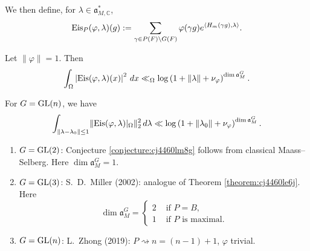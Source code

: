 \documentclass[reqno]{amsart} 
\begin{document}
We then define, for $\lambda \in \mathfrak{a}_{M, \mathbb{C} }^\ast$,
\begin{equation*}
  \operatorname{Eis}_P (\varphi, \lambda ) (g ) :=
  \sum_{\gamma \in P (F) \backslash G (F) } \varphi (\gamma g )
  e^{\left\langle H_m  (\gamma g), \lambda  \right\rangle}.
\end{equation*}
\begin{conjecture}\label{conjecture:cj4460lm8g}
  Let $\lVert \varphi  \rVert = 1$.  Then
  \begin{equation*}
    \int_{\Omega }
    \left\lvert \operatorname{Eis} (\varphi, \lambda ) (x)  \right\rvert^2 \, d x
    \ll_{\Omega}    \log \left( 1 + \lVert \lambda  \rVert + \nu_\varphi  \right)^{\dim \mathfrak{a}_M^G}.
\end{equation*}
\end{conjecture}
\begin{theorem}[J--Kamber 22+]\label{theorem:cj4460le6j}
  For $G = \operatorname{GL}(n)$, we have
  \begin{equation*}
    \int_{\lVert \lambda - \lambda_0 \rVert \leq 1 }
    \lVert \operatorname{Eis} (\varphi, \lambda ) |_{\Omega} \rVert_2^2
    \, d \lambda
    \ll \log \left( 1 + \lVert \lambda_0  \rVert + \nu_\varphi  \right)
    ^{\dim \mathfrak{a}_M^G }.
  \end{equation*}
\end{theorem}
\begin{enumerate}
\item $G = \operatorname{GL}(2)$: Conjecture \ref{conjecture:cj4460lm8g} follows from classical Maass--Selberg.  Here $\dim \mathfrak{a}_M^G = 1$.
\item $G = \operatorname{GL}(3)$: S.\ D.\ Miller (2002): analogue of Theorem \ref{theorem:cj4460le6j}.  Here
  \begin{equation*}
    \dim \mathfrak{a}_M^G =
    \begin{cases}
      2 & \text{ if } P = B, \\
      1 & \text{ if $P$ is maximal.} 
    \end{cases}
  \end{equation*}
  
\item $G = \operatorname{GL}(n)$: L.\ Zhong (2019): $P \rightsquigarrow n = (n-1) + 1$, $\varphi$ trivial.
\end{enumerate}
\end{document}
